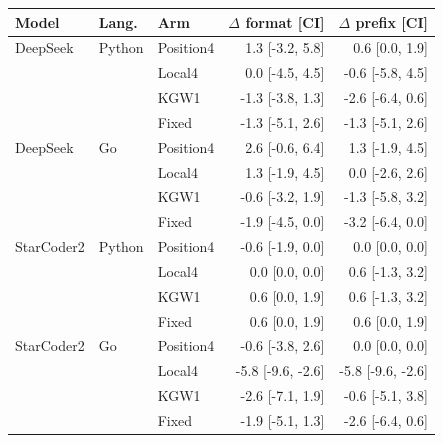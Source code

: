 \begin{tabular}{lllrr}
\toprule
Model & Lang. & Arm & $\Delta$ format [CI] & $\Delta$ prefix [CI] \\
\midrule
DeepSeek & Python & Position4 & 1.3 [-3.2, 5.8] & 0.6 [0.0, 1.9] \\
 &  & Local4 & 0.0 [-4.5, 4.5] & -0.6 [-5.8, 4.5] \\
 &  & KGW1 & -1.3 [-3.8, 1.3] & -2.6 [-6.4, 0.6] \\
 &  & Fixed & -1.3 [-5.1, 2.6] & -1.3 [-5.1, 2.6] \\
DeepSeek & Go & Position4 & 2.6 [-0.6, 6.4] & 1.3 [-1.9, 4.5] \\
 &  & Local4 & 1.3 [-1.9, 4.5] & 0.0 [-2.6, 2.6] \\
 &  & KGW1 & -0.6 [-3.2, 1.9] & -1.3 [-5.8, 3.2] \\
 &  & Fixed & -1.9 [-4.5, 0.0] & -3.2 [-6.4, 0.0] \\
StarCoder2 & Python & Position4 & -0.6 [-1.9, 0.0] & 0.0 [0.0, 0.0] \\
 &  & Local4 & 0.0 [0.0, 0.0] & 0.6 [-1.3, 3.2] \\
 &  & KGW1 & 0.6 [0.0, 1.9] & 0.6 [-1.3, 3.2] \\
 &  & Fixed & 0.6 [0.0, 1.9] & 0.6 [0.0, 1.9] \\
StarCoder2 & Go & Position4 & -0.6 [-3.8, 2.6] & 0.0 [0.0, 0.0] \\
 &  & Local4 & -5.8 [-9.6, -2.6] & -5.8 [-9.6, -2.6] \\
 &  & KGW1 & -2.6 [-7.1, 1.9] & -0.6 [-5.1, 3.8] \\
 &  & Fixed & -1.9 [-5.1, 1.3] & -2.6 [-6.4, 0.6] \\
\bottomrule
\end{tabular}
